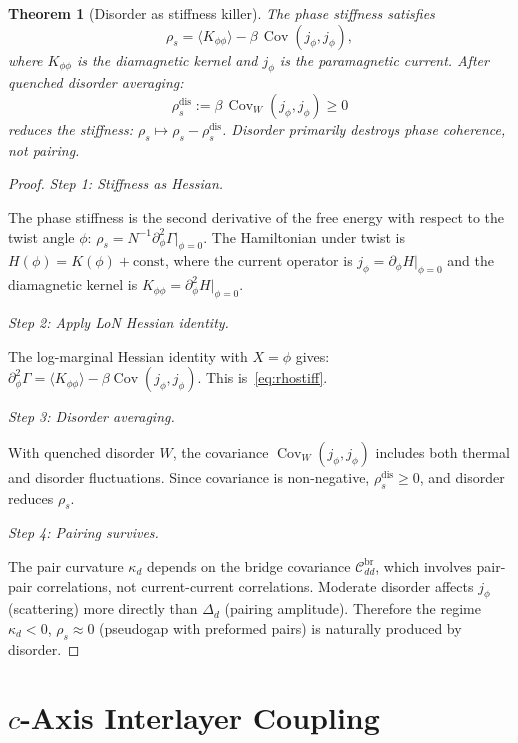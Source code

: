 \documentclass[12pt]{article}
\theoremstyle{plain}
\newtheorem{theorem}{Theorem}[section]
\theoremstyle{definition}
\numberwithin{equation}{section}
\newcommand{\br}{\mathrm{br}}
\DeclareMathOperator{\Cov}{Cov}
\begin{document}
\begin{theorem}[Disorder as stiffness killer]\label{thm:disorder}
The phase stiffness satisfies
\begin{equation}\label{eq:rhostiff}
\rho_s = \langle K_{\phi\phi}\rangle
- \beta\,\Cov(j_\phi,j_\phi),
\end{equation}
where $K_{\phi\phi}$ is the diamagnetic kernel and $j_\phi$ is
the paramagnetic current.  After quenched disorder averaging:
\begin{equation}\label{eq:Cdis}
\boxed{\rho_s^{\mathrm{dis}}
:= \beta\,\Cov_W(j_\phi,j_\phi) \geq 0}
\end{equation}
reduces the stiffness: $\rho_s\mapsto\rho_s-\rho_s^{\mathrm{dis}}$.
Disorder primarily destroys phase coherence, not pairing.
\end{theorem}

\begin{proof}
\emph{Step 1: Stiffness as Hessian.}

The phase stiffness is the second derivative of the free energy
with respect to the twist angle $\phi$:
$\rho_s=N^{-1}\partial_\phi^2\Gamma|_{\phi=0}$.
The Hamiltonian under twist is
$H(\phi)=K(\phi)+\text{const}$, where the current operator is
$j_\phi=\partial_\phi H|_{\phi=0}$ and the diamagnetic kernel is
$K_{\phi\phi}=\partial_\phi^2 H|_{\phi=0}$.

\emph{Step 2: Apply LoN Hessian identity.}

The log-marginal Hessian identity with $X=\phi$ gives:
$\partial_\phi^2\Gamma=\langle K_{\phi\phi}\rangle
-\beta\Cov(j_\phi,j_\phi)$.
This is~\eqref{eq:rhostiff}.

\emph{Step 3: Disorder averaging.}

With quenched disorder $W$, the covariance $\Cov_W(j_\phi,j_\phi)$
includes both thermal and disorder fluctuations.  Since covariance
is non-negative, $\rho_s^{\mathrm{dis}}\geq 0$, and disorder
reduces $\rho_s$.

\emph{Step 4: Pairing survives.}

The pair curvature $\kappa_d$ depends on the bridge covariance
$\mathcal{C}_{dd}^{\br}$, which involves pair-pair correlations,
not current-current correlations.  Moderate disorder affects
$j_\phi$ (scattering) more directly than $\Delta_d$ (pairing
amplitude).  Therefore the regime $\kappa_d<0$, $\rho_s\approx 0$
(pseudogap with preformed pairs) is naturally produced by disorder.
\end{proof}


\section{$c$-Axis Interlayer Coupling}\label{sec:caxis}
\end{document}
